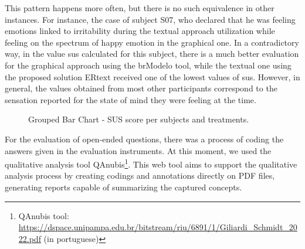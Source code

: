 This pattern happens more often, but there is no such equivalence in other instances.
For instance, the case of subject S07, who declared that he was feeling emotions linked to irritability during the textual approach utilization while feeling on the spectrum of happy emotion in the graphical one.
In a contradictory way, in the value \ac{sus} calculated for this subject, there is a much better evaluation for the graphical approach using the brModelo tool, while the textual one using the proposed solution ERtext received one of the lowest values of \ac{sus}.
However, in general, the values obtained from most other participants correspond to the sensation reported for the state of mind they were feeling at the time.

\begin{figure}[!htb]
    \centering
    \caption{Grouped Bar Chart - SUS score per subjects and treatments.}
    \label{fig:GroupedBarSUS_tools}
    
\end{figure}

For the evaluation of open-ended questions, there was a process of coding the answers given in the evaluation instruments.
At this moment, we used the qualitative analysis tool QAnubis\footnote{QAnubis tool: \url{https://dspace.unipampa.edu.br/bitstream/riu/6891/1/Giliardi_Schmidt_2022.pdf} (in portuguese)}.
This web tool aims to support the qualitative analysis process by creating codings and annotations directly on PDF files, generating reports capable of summarizing the captured concepts.

